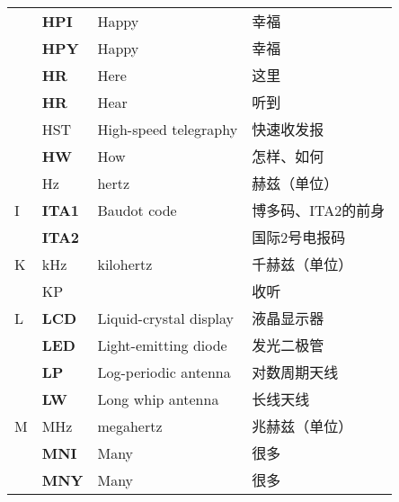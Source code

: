 \begin{longtable}[l]{llll}
    & \textbf{HPI}                      & Happy                                   & 幸福                  \\
    & \textbf{HPY}                      & Happy                                   & 幸福                  \\
    & \textbf{HR}                       & Here                                    & 这里                  \\
    & \textbf{HR}                       & Hear                                    & 听到                  \\
    & HST                               & High-speed telegraphy                   & 快速收发报               \\
    & \textbf{HW}                       & How                                     & 怎样、如何               \\
    & Hz                                & hertz                                   & 赫兹（单位）              \\
  I & \textbf{ITA1}                     & Baudot code                             & 博多码、ITA2的前身         \\
    & \textbf{ITA2}                     &                                         & 国际2号电报码             \\
  K & \si{\kHz}                         & kilohertz                               & 千赫兹（单位）             \\
    & KP                                &                                         & 收听                  \\
  L & \textbf{LCD}                      & Liquid-crystal display                  & 液晶显示器               \\
    & \textbf{LED}                      & Light-emitting diode                    & 发光二极管               \\
    & \textbf{LP}                       & Log-periodic antenna                    & 对数周期天线              \\
    & \textbf{LW}                       & Long whip antenna                       & 长线天线                \\
  M & \si{\MHz}                         & megahertz                               & 兆赫兹（单位）             \\
    & \textbf{MNI}                      & Many                                    & 很多                  \\
    & \textbf{MNY}                      & Many                                    & 很多                  \\

\end{longtable}
